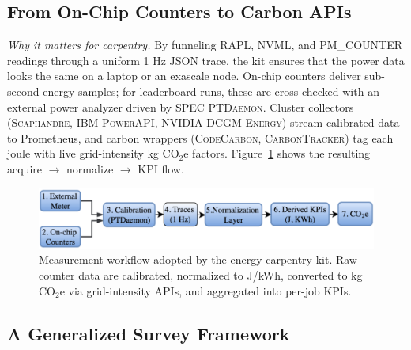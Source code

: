 \subsection{From On-Chip Counters to Carbon APIs} %
\label{sec:energy:instr}

\textit{Why it matters for carpentry.} By funneling RAPL, NVML, and PM\_COUNTER readings through a uniform 1 Hz JSON trace, the kit ensures that the power data looks the same on a laptop or an exascale node. On-chip counters deliver sub-second energy samples; for leaderboard runs, these are cross-checked with an external power analyzer driven by \textsc{SPEC PTDaemon}. Cluster collectors (\textsc{Scaphandre},
IBM \textsc{PowerAPI}, NVIDIA \textsc{DCGM Energy}) stream calibrated data to Prometheus, and carbon wrappers (\textsc{CodeCarbon}, \textsc{CarbonTracker}) tag each joule with live grid-intensity kg CO\(_2\)e factors. Figure~\ref{fig:pipeline} shows the resulting
acquire $\rightarrow$ normalize $\rightarrow$ KPI flow.

\begin{figure}[!ht]
  \centering
  \includegraphics[scale=0.22]{images/kpi.pdf}
  \caption{Measurement workflow adopted by the energy-carpentry kit. Raw counter data are calibrated, normalized to J/kWh, converted to kg CO\(_2\)e via grid-intensity APIs, and aggregated into per-job KPIs. }
  \label{fig:pipeline}
\end{figure}

\subsection{A Generalized Survey Framework}
\label{sec:energy:survey}

